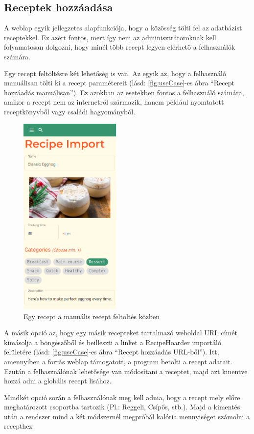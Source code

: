 \documentclass[12pt]{report}
\theoremstyle{definition}
\begin{document}
 
\subsection{Receptek hozzáadása} 
A weblap egyik jellegzetes alapfunkciója, hogy a közösség tölti fel az adatbázist receptekkel. Ez azért fontos, mert így nem az adminisztrátoroknak kell folyamatosan dolgozni, hogy minél több recept legyen elérhető a felhasználók számára. 

Egy recept feltöltésre két lehetőség is van. Az egyik az, hogy a felhasználó manuálisan tölti ki a recept paramétereit (lásd: \ref{fig:useCase}-es ábra “Recept hozzáadás manuálisan”). Ez azokban az esetekben fontos a felhasználó számára, amikor a recept nem az internetről származik, hanem például nyomtatott receptkönyvből vagy családi hagyományból. 

\begin{figure}[H]%
    \centering
    \includegraphics[width=5cm]{pictures/mobile_importDataCheck.png}
	\caption{Egy recept a manuális recept feltöltés közben}%
    \label{fig:importcheck}%
\end{figure}

A másik opció az, hogy egy másik recepteket tartalmazó weboldal URL címét kimásolja a böngészőből és beilleszti a linket a RecipeHoarder importáló felületére (lásd: \ref{fig:useCase}-es ábra “Recept hozzáadás URL-ből”). Itt, amennyiben a forrás weblap támogatott, a program betölti a recept adatait. Ezután a felhasználónak lehetősége van módosítani a receptet, majd azt kinentve hozzá adni a globális recept lisához.

Mindkét opció során a felhasználónak meg kell adnia, hogy a recept mely előre meghatározott csoportba tartozik (Pl.: Reggeli, Csípős, stb.). Majd a kimentés után a rendszer mind a két módszernél megpróbál kalória mennyiséget számolni a recepthez.
\end{document}
